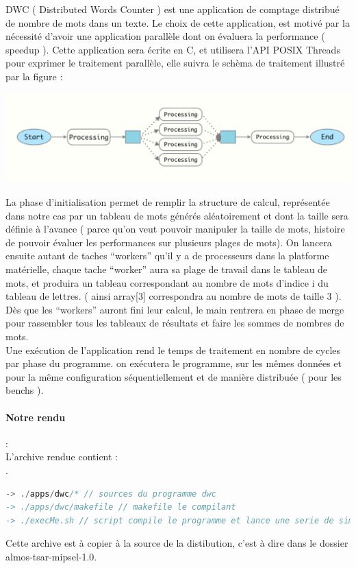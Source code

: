 DWC ( Distributed Words Counter ) est une application de comptage distribué de nombre de mots dans un texte. Le choix de cette application, est motivé par la nécessité d'avoir une application parallèle dont on évaluera la performance ( speedup ). Cette application sera écrite en C, et utilisera l'API POSIX Threads pour exprimer le traitement parallèle, elle suivra le schèma de traitement illustré par la figure :\\

\begin{center}
\includegraphics[scale=0.4]{images/processing.png}
\end{center}

La phase d'initialisation permet de remplir la structure de calcul, représentée dans notre cas par un tableau de mots générés aléatoirement et dont la taille sera définie à l'avance ( parce qu'on veut pouvoir manipuler la taille de mots, histoire de pouvoir évaluer les performances sur plusieurs plages de mots). On lancera ensuite autant de taches ``workers'' qu'il y a de processeurs dans la platforme matérielle, chaque tache ``worker'' aura sa plage de travail dans le tableau de mots, et produira un tableau correspondant au nombre de mots d'indice i du tableau de lettres. ( ainsi array[3] correspondra au nombre de mots de taille 3 ). Dès que les ``workers'' auront fini leur calcul, le main rentrera en phase de merge pour rassembler tous les tableaux de résultats et faire les sommes de nombres de mots.\\

Une exécution de l'application rend le temps de traitement en nombre de cycles par phase du programme. on exécutera le programme, sur les mêmes données et pour la même configuration séquentiellement et de manière distribuée ( pour les benchs ).\\

\paragraph{Notre rendu}:\\

L'archive rendue contient :\\
.\\
\begin{DDbox}{\linewidth}
\begin{lstlisting}[language=C]
-> ./apps/dwc/* // sources du programme dwc
-> ./apps/dwc/makefile // makefile le compilant
-> ./execMe.sh // script compile le programme et lance une serie de simulations comme decrit dans le paragraphe precedant
\end{lstlisting}
\end{DDbox}
Cette archive est à copier à la source de la distibution, c'est à dire dans le dossier almos-tsar-mipsel-1.0.
